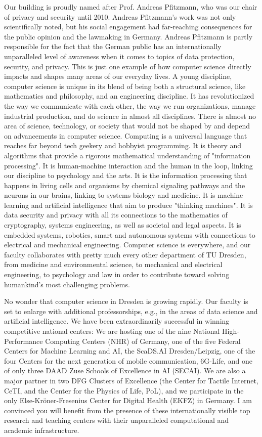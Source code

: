 {Our building is proudly named after Prof. Andreas Pfitzmann, who was our chair of privacy and security until 2010. Andreas Pfitzmann's work was not only scientifically noted, but his social engagement had far-reaching consequences for the public opinion and the lawmaking in Germany. Andreas Pfitzmann is partly responsible for the fact that the German public has an internationally unparalleled level of awareness when it comes to topics of data protection, security, and privacy.  This is just one example of how computer science directly impacts and shapes many areas of our everyday lives. A young discipline, computer science is unique in its blend of being both a structural science, like mathematics and philosophy, and an engineering discipline. It has revolutionized the way we communicate with each other, the way we run organizations, manage industrial production, and do science in almost all disciplines. There is almost no area of science, technology, or society that would not be shaped by and depend on advancements in computer science. Computing is a universal language that reaches far beyond tech geekery and hobbyist programming. It is theory and algorithms that provide a rigorous mathematical understanding of "information processing". It is human-machine interaction and the human in the loop, linking our discipline to psychology and the arts. It is the information processing that happens in living cells and organisms by chemical signaling pathways and the neurons in our brains, linking to systems biology and medicine. It is machine learning and artificial intelligence that aim to produce "thinking machines". It is data security and privacy with all its connections to the mathematics of cryptography, systems engineering, as well as societal and legal aspects. It is embedded systems, robotics, smart and autonomous systems with connections to electrical and mechanical engineering. Computer science is everywhere, and our faculty collaborates with pretty much every other department of TU Dresden, from medicine and environmental science, to mechanical and electrical engineering, to psychology and law in order to contribute toward solving humankind’s most challenging problems.

No wonder that computer science in Dresden is growing rapidly. Our faculty is set to enlarge with additional professorships, e.g., in the areas of data science and artificial intelligence. We have been extraordinarily successful in winning competitive national centers: We are hosting one of the nine National High-Performance Computing Centers (NHR) of Germany, one of the five Federal Centers for Machine Learning and AI, the ScaDS.AI Dresden/Leipzig, one of the four Centers for the next generation of mobile communication, 6G-Life, and one of only three DAAD Zuse Schools of Excellence in AI (SECAI). We are also a major partner in two DFG Clusters of Excellence (the Center for Tactile Internet, CeTI, and the Center for the Physics of Life, PoL), and we participate in the only Else-Kröner-Fresenius Center for Digital Health (EKFZ) in Germany. I am convinced you will benefit from the presence of these internationally visible top research and teaching centers with their unparalleled computational and academic infrastructure. 

}
